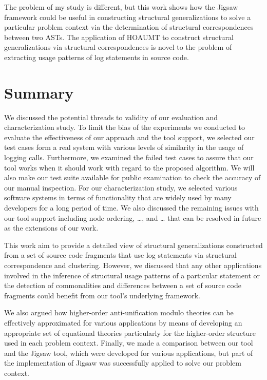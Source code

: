 
The problem of my study is different, but this work shows how the Jigsaw framework could be useful in constructing structural generalizations to solve a particular problem context via the determination of structural correspondences between two ASTs. The application of HOAUMT to construct structural generalizations via structural correspondences is novel to the problem of extracting usage patterns of log statements in source code.


\section{Summary}  \label{diss-summary}
We discussed the potential threads to validity of our evaluation and characterization study. To limit the bias of the experiments we conducted to evaluate the effectiveness of our approach and the tool support, we selected our test cases form a real system with various levels of similarity in the usage of logging calls. Furthermore, we examined the failed test cases to assure that our tool works when it should work with regard to the proposed algorithm. We will also make our test suite available for public examination to check the accuracy of our manual inspection. For our characterization study, we selected various software systems in terms of functionality that are widely used by many developers for a long period of time. We also discussed the remaining issues with our tool support including node ordering, …, and … that can be resolved in future as the extensions of our work.

This work aim to provide a detailed view of structural generalizations constructed from a set of source code fragments that use log statements via structural correspondence and clustering. However, we discussed that any other applications involved in the inference of structural usage patterns of a particular statement or the detection of commonalities and differences between a set of source code fragments could benefit from our tool’s underlying framework.

We also argued how higher-order anti-unification modulo theories can be effectively approximated for various applications by means of developing an appropriate set of equational theories particularly for the higher-order structure used in each problem context. Finally, we made a comparison between our tool and the Jigsaw tool, which were developed for various applications, but part of the implementation of Jigsaw was successfully applied to solve our problem context.
